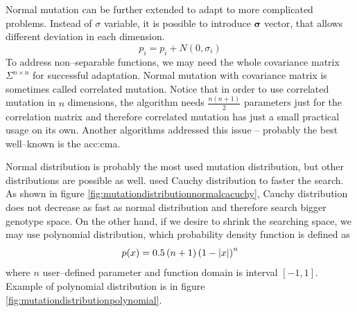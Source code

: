 Normal mutation can be further extended to adapt to more complicated problems. Instead of $\sigma$ variable, it is possible to introduce $\boldsymbol{\sigma}$ vector, that allows different deviation in each dimension.
$$
p_i = p_i + N(0,\sigma_i)
$$ 
To address non--separable functions, we may need the whole covariance matrix $\Sigma^{n \times n}$ for successful adaptation. Normal mutation with covariance matrix is sometimes called correlated mutation. Notice that in order to use correlated mutation in $n$ dimensions, the algorithm needs $\frac{n\left(n+1\right)}{2}$ parameters just for the correlation matrix and therefore correlated mutation has just a small practical usage on its own. Another algorithms addressed this issue -- probably the best well--known is the \acrfull{acc:cma}.

Normal distribution is probably the most used mutation distribution, but other distributions are possible as well. \citet*{CauchyDistributionMutation} used Cauchy distribution to faster the search. As shown in figure \ref{fig:mutationdistributionnormalcacuchy}, Cauchy distribution does not  decrease as fast as normal distribution and therefore search bigger genotype space. On the other hand, if we desire to shrink the searching space, we may use polynomial distribution, which probability density function is defined as
$$
p(x)=0.5 \left(n + 1\right)\left( 1 - \left|{x}\right| \right)^n
$$ 
where $n$ user--defined parameter and function domain is interval $\left[-1,1\right]$. Example of polynomial distribution is in figure \ref{fig:mutationdistributionpolynomial}.

